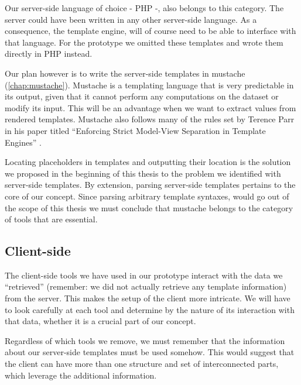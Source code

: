 \documentclass[thesis.tex]{subfiles}
\begin{document}
Our server-side language of choice - PHP -, also belongs to this category.
The server could have been written in any other server-side language.
As a consequence, the template engine, will of course need to be
able to interface with that language. For the prototype we omitted these
templates and wrote them directly in PHP instead.

Our plan however is to write the server-side templates in mustache
(\ref{chap:mustache}). Mustache is a templating language that is very
predictable in its output, given that it cannot perform any computations on the
dataset or modify its input. This will be an advantage when we want to extract
values from rendered templates. Mustache also follows many of the rules set by
Terence Parr in his paper titled ``Enforcing Strict Model-View Separation in
Template Engines'' \cite{STRINGTPL}. 

Locating placeholders in templates and outputting their location is the solution
we proposed in the beginning of this thesis to the problem we identified with
server-side templates.
By extension, parsing server-side templates pertains to the core of our concept.
Since parsing arbitrary template syntaxes, would go out of the scope of this
thesis we must conclude that mustache belongs to the category of tools that
are essential.

\subsection{Client-side}
The client-side tools we have used in our prototype interact with the data we
``retrieved'' (remember: we did not actually retrieve any template information)
from the server. This makes the setup of the client more intricate. We will have
to look carefully at each tool and determine by the nature of its interaction
with that data, whether it is a crucial part of our concept.

Regardless of which tools we remove, we must remember that the information about
our server-side templates must be used somehow. This would suggest that the
client can have more than one structure and set of interconnected parts, which
leverage the additional information.
\end{document}
